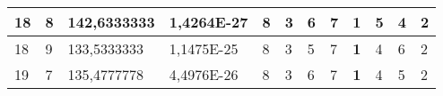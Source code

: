 \documentclass[conference]{IEEEtran}
\begin{document}
\begin{table*}[]
\begin{tabular}{|llll|llllllll|}
\multicolumn{1}{|l|}{18}                                                             & \multicolumn{1}{l|}{8}                                                                 & \multicolumn{1}{l|}{142,6333333}                                                           & 1,4264E-27                              & \multicolumn{1}{l|}{8}                                                           & \multicolumn{1}{l|}{3}                                                           & \multicolumn{1}{l|}{6}                                                           & \multicolumn{1}{l|}{7}                                                           & \multicolumn{1}{l|}{\textbf{1}}                                                  & \multicolumn{1}{l|}{5}                                                           & \multicolumn{1}{l|}{4}                                                           & 2                                   \\ \hline
\multicolumn{1}{|l|}{18}                                                             & \multicolumn{1}{l|}{9}                                                                 & \multicolumn{1}{l|}{133,5333333}                                                           & 1,1475E-25                              & \multicolumn{1}{l|}{8}                                                           & \multicolumn{1}{l|}{3}                                                           & \multicolumn{1}{l|}{5}                                                           & \multicolumn{1}{l|}{7}                                                           & \multicolumn{1}{l|}{\textbf{1}}                                                  & \multicolumn{1}{l|}{4}                                                           & \multicolumn{1}{l|}{6}                                                           & 2                                   \\ \hline
\multicolumn{1}{|l|}{19}                                                             & \multicolumn{1}{l|}{7}                                                                 & \multicolumn{1}{l|}{135,4777778}                                                           & 4,4976E-26                              & \multicolumn{1}{l|}{8}                                                           & \multicolumn{1}{l|}{3}                                                           & \multicolumn{1}{l|}{6}                                                           & \multicolumn{1}{l|}{7}                                                           & \multicolumn{1}{l|}{\textbf{1}}                                                  & \multicolumn{1}{l|}{4}                                                           & \multicolumn{1}{l|}{5}                                                           & 2                                   \\ \hline

\end{tabular}
\end{table*}
\end{document}
